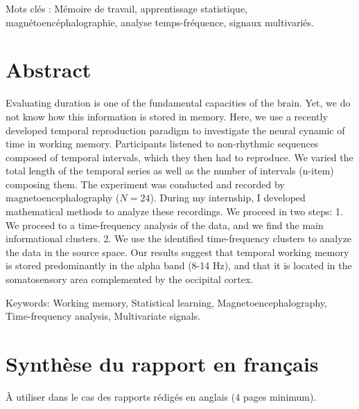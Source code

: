 Mots clés :
Mémoire de travail, apprentissage statistique, magnétoencéphalographie, analyse temps-fréquence, signaux multivariés.

\chapter*{\centering Abstract}

Evaluating duration is one of the fundamental capacities of the brain. Yet, we do not know how this information is stored in memory. Here, we use a recently developed temporal reproduction paradigm to investigate the neural cynamic of time in working memory. Participants listened to non-rhythmic sequences composed of temporal intervals, which they then had to reproduce. We varied the total length of the temporal series as well as the number of intervals (n-item) composing them. The experiment was conducted and recorded by magnetoencephalography ($N=24$). During my internship, I developed mathematical methods to analyze these recordings. We proceed in two steps: 1. We proceed to a time-frequency analysis of the data, and we find the main informational clusters. 2. We use the identified time-frequency clusters to analyze the data in the source space. Our results suggest that temporal working memory is stored predominantly in the alpha band (8-14 Hz), and that it is located in the somatosensory area complemented by the occipital cortex.

Keywords:
Working memory, Statistical learning, Magnetoencephalography, Time-frequency analysis, Multivariate signals.

\chapter*{\centering Synthèse du rapport en français}

À utiliser dans le cas des rapports rédigés en anglais (4 pages minimum).
